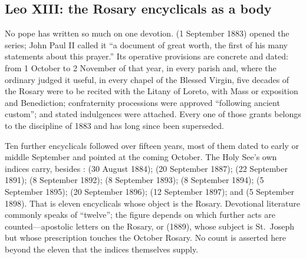 \subsection{Leo XIII: the Rosary encyclicals as a body}

No pope has written so much on one devotion.  (1 September 1883) opened the series; John Paul II called it
``a document of great worth, the first of his many statements about this
prayer.'' Its operative provisions are concrete and dated: from 1 October
to 2 November of that year, in every parish and, where the ordinary
judged it useful, in every chapel of the Blessed Virgin, five decades of
the Rosary were to be recited with the Litany of Loreto, with Mass or
exposition and Benediction; confraternity processions were approved
``following ancient custom''; and stated indulgences were attached. Every
one of those grants belongs to the discipline of 1883 and has long since
been superseded.

Ten further encyclicals followed over fifteen years, most of them dated
to early or middle September and pointed at the coming October. The
Holy See's own indices carry, besides :  (30 August 1884); 
(20 September 1887);  (22 September 1891);
 (8 September 1892);  (8
September 1893);  (8 September 1894);
 (5 September 1895);  (20
September 1896);  (12 September
1897); and  (5 September 1898). That is eleven
encyclicals whose object is the Rosary. Devotional literature commonly
speaks of ``twelve''; the figure depends on which further acts are
counted---apostolic letters on the Rosary, or 
(1889), whose subject is St.~Joseph but whose prescription touches the
October Rosary. No count is asserted here beyond the eleven that the
indices themselves supply.

